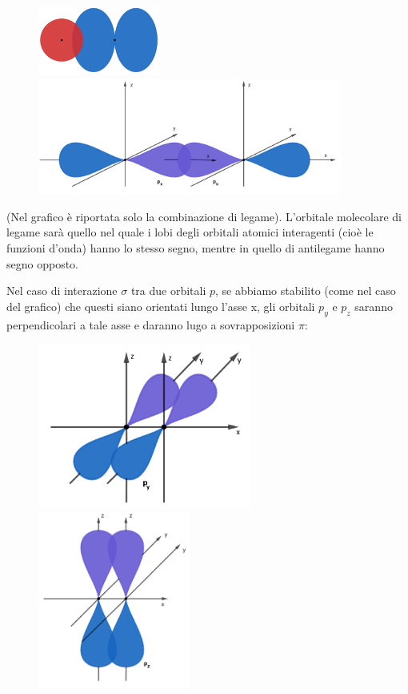 \begin{figure}[!tbp]
    \centering
    {\includegraphics[width=4cm]{immagini/legame_sigma_s_p.png}\label{fig:f1}}
    \hfill
    {\includegraphics[width=10cm]{immagini/legame_sigma_p_p.png}\label{fig:f2}}
  \end{figure}

(Nel grafico è riportata solo la combinazione di legame).
L'orbitale molecolare di legame sarà quello nel quale i lobi degli orbitali atomici interagenti (cioè le funzioni d'onda) hanno lo stesso segno, mentre in quello di antilegame hanno segno opposto.

Nel caso di interazione $\sigma$ tra due orbitali $p$, se abbiamo stabilito (come nel caso del grafico) che questi siano orientati lungo l'asse x, gli orbitali $p_y$ e $p_z$ saranno perpendicolari a tale asse e daranno lugo a sovrapposizioni $\pi$:

\begin{figure}[!tbp]
    \centering
    {\includegraphics[width=7cm]{immagini/orbitali_py.png}\label{fig:f3}}
    \hfill
    {\includegraphics[width=5cm]{immagini/orbitali_pz.png}\label{fig:f4}}
\end{figure}

